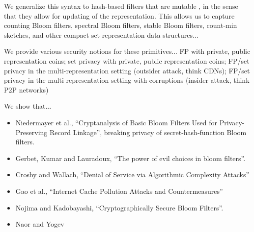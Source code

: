 We generalize this syntax to hash-based filters that are mutable
 , in the sense
that they allow for updating of the representation. This allows us
to capture counting Bloom filters, spectral Bloom filters, stable
Bloom filters, count-min sketches, and other compact set
representation data structures...

We provide various security notions for these primitives... FP with private, public representation coins; set privacy with private, public representation coins; FP/set privacy in the multi-representation setting (outsider attack, think CDNs); FP/set privacy in the multi-representation setting with corruptions (insider attack, think P2P networks) 


We show that...

\begin{itemize}
\item Niedermayer et al., ``Cryptanalysis of Basic Bloom Filters Used for Privacy-Preserving Record Linkage'', breaking privacy of secret-hash-function Bloom filters. 
\item Gerbet, Kumar and Lauradoux, ``The power of evil choices in bloom filters''.  
\item Crosby and Wallach, ``Denial of Service via Algorithmic Complexity Attacks'' 
\item Gao et al., ``Internet Cache Pollution Attacks and Countermeasures''
\end{itemize}

\begin{itemize}
\item Nojima and Kadobayashi, ``Cryptographically Secure Bloom Filters''. 
\item Naor and Yogev
\end{itemize}

